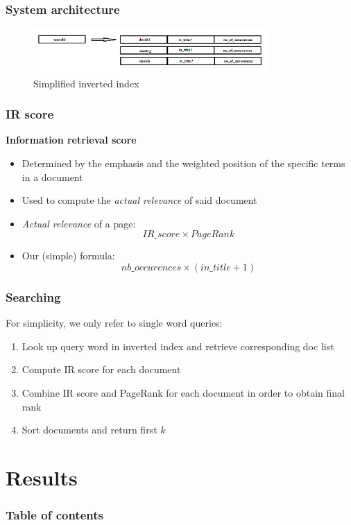 \documentclass[10pt]{beamer}
\begin{document}
\begin{frame}
  \frametitle{System architecture}
  \begin{figure}[h]
    \includegraphics[width=0.8\textwidth]{index.png}
    \caption{Simplified inverted index}
  \end{figure}
\end{frame}

\begin{frame}
  \frametitle{IR score}
  \textbf{Information retrieval score}
  \begin{itemize}
    \item Determined by the emphasis and the weighted position of the specific terms in a document
    \item Used to compute the \emph{actual relevance}  of said document
    \item \emph{Actual relevance} of a page: $$IR\_score \times PageRank$$
    \item Our (simple) formula: $$nb\_occurences \times (in\_title + 1)$$
  \end{itemize}
\end{frame}

\begin{frame}
  \frametitle{Searching}
  For simplicity, we only refer to single word queries:
  \begin{enumerate}
    \item Look up query word in inverted index and retrieve corresponding doc list
    \item Compute IR score for each document
    \item Combine IR score and PageRank for each document in order to obtain final rank
    \item Sort documents and return first $k$
  \end{enumerate}
\end{frame}



\section{Results}

\begin{frame}
  \frametitle{Table of contents}
  \tableofcontents[currentsection]
\end{frame}
\end{document}
